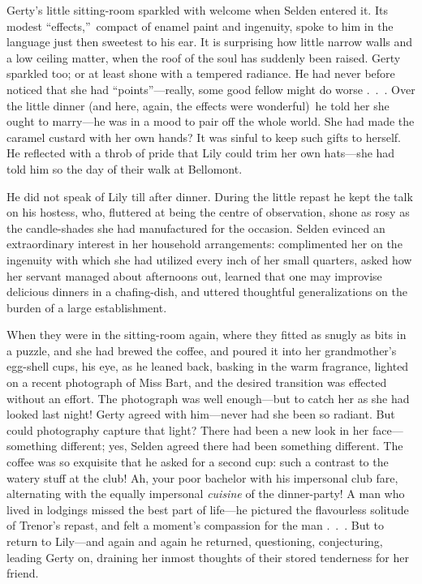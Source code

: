 \documentclass[12pt,a4paper]{book}
\begin{document}
Gerty's little sitting-room sparkled with welcome when Selden
entered it. Its modest ``effects,''\ compact of enamel paint and
ingenuity, spoke to him in the language just then sweetest to his
ear. It is surprising how little narrow walls and a low ceiling
matter, when the roof of the soul has suddenly been raised. Gerty
sparkled too; or at least shone with a tempered radiance. He had
never before noticed that she had ``points''---really, some good
fellow might do worse .\ .\ . Over the little dinner (and here,
again, the effects were wonderful)\ he told her she ought to
marry---he was in a mood to pair off the whole world. She had made
the caramel custard with her own hands? It was sinful to keep
such gifts to herself. He reflected with a throb of pride that
Lily could trim her own hats---she had told him so the day of
their walk at Bellomont.





He did not speak of Lily till after dinner. During the little
repast he kept the talk on his hostess, who, fluttered at being
the centre of observation, shone as rosy as the candle-shades she
had manufactured for the occasion. Selden evinced an
extraordinary interest in her household arrangements: 
complimented her on the ingenuity with which she had utilized
every inch of her small quarters, asked how her servant managed
about afternoons out, learned that one may improvise
delicious dinners in a chafing-dish, and uttered thoughtful
generalizations on the burden of a large establishment.





When they were in the sitting-room again, where they fitted as
snugly as bits in a puzzle, and she had brewed the coffee, and
poured it into her grandmother's egg-shell cups, his eye, as he
leaned back, basking in the warm fragrance, lighted on a recent
photograph of Miss Bart, and the desired transition was effected
without an effort. The photograph was well enough---but to catch
her as she had looked last night! Gerty agreed with him---never
had she been so radiant. But could photography capture that
light? There had been a new look in her face---something
different; yes, Selden agreed there had been something different. 
The coffee was so exquisite that he asked for a second cup: such
a contrast to the watery stuff at the club! Ah, your poor
bachelor with his impersonal club fare, alternating with the
equally impersonal \textit{cuisine} of the dinner-party! A man who lived
in lodgings missed the best part of life---he pictured the
flavourless solitude of Trenor's repast, and felt a moment's
compassion for the man .\ .\ . But to return to Lily---and again and
again he returned, questioning, conjecturing, leading Gerty on,
draining her inmost thoughts of their stored tenderness for her
friend.
\end{document}
